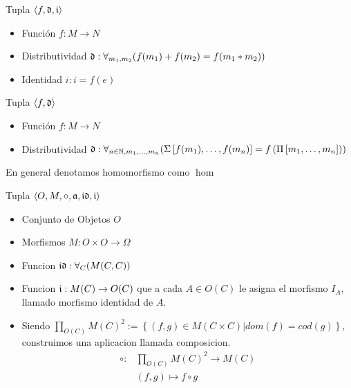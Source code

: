 \begin{defn}
\end{defn}
Tupla $\langle f, \mathfrak{d}, \mathfrak{i} \rangle$ 
\begin{itemize}
\item Función $f : M \to N$ 
\item Distributividad $\mathfrak{d} : \forall_{m_1, m_2}( f(m_1) + f(m_2) = f(m_1 * m_2))$
\item Identidad ${i} : i = f(e)$
\end{itemize}

\begin{defn}
\end{defn}
Tupla $\langle f, \mathfrak{d} \rangle$ 
\begin{itemize}
\item Función $f: M \to N$
\item Distributividad $\mathfrak{d} : \forall_{ n \in \mathbb{N}, m_1, \dots, m_n }( \Sigma \left[f(m_1), \dots, f(m_n)\right] = f\left(\Pi \left[m_1, \dots, m_n\right]\right))$
\end{itemize}

\begin{note}
En general denotamos homomorfismo como  $\hom$
\end{note}

\begin{defn}[Categoria]
\end{defn}
Tupla $\langle O,M,\circ,\mathfrak{a},\mathfrak{id},\mathfrak{i} \rangle$ 
\begin{itemize}
\item Conjunto de Objetos $O$
\item Morfismos $M: O \times O \to \Omega$
\item Funcion $\mathfrak{id} : \forall_C (M(C,C))$
\item Funcion $\mathfrak{i} : M(C) \to O(C)$ que a cada $A \in O(C)$ le
asigna el morfismo $I_A$, llamado morfismo identidad de $A$.
\item Siendo $\displaystyle \prod_{O(C)} M(C)^2 := \left\lbrace (f, g) \in M(C \times C) | dom(f)=cod(g) \right\rbrace$, construimos una aplicacion llamada composicion.
\begin{align*}
  \displaystyle \circ: & \prod_{O(C)} M(C)^2  \to M(C) \\
					   & (f,g) 					  \mapsto f \circ g
\end{align*}
\end{itemize}

